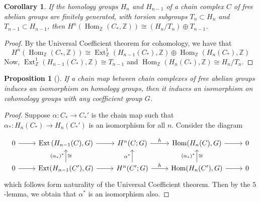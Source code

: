 \documentclass[reqno]{amsart}
\newtheorem{proposition}[theorem]{Proposition}
\newtheorem{corollary}[theorem]{Corollary}
\theoremstyle{definition}
\theoremstyle{remark}
\DeclareMathOperator{\Hom}{Hom}
\DeclareMathOperator{\Ext}{Ext}
\begin{document}
    \begin{corollary}\label{Cor:JSIOA}
        If the homology groups $H_n$ and
        $H_{n-1}$ of a chain complex
        $C$ of free abelian groups are finitely
        generated, with torsion subgroups
        $T_n \subset H_n$ and 
        $T_{n-1} \subset H_{n-1}$, then
        $H^{n}( \Hom_\mathbb{Z} (C_*, \mathbb{Z}) ) \cong
        \left( H_n / T_n \right) \oplus T_{n-1}$.
    \end{corollary}

    \begin{proof}
        By the Universal Coefficient theorem for cohomology, we
        have that
        \[
        H^{n} \left( 
        \Hom_\mathbb{Z} \left( C_*, \mathbb{Z} \right) \right) 
        \cong
        \Ext_{\mathbb{Z}}^{1} 
        \left( H_{n-1}(C_*), \mathbb{Z} \right) 
        \oplus \Hom_{\mathbb{Z}} \left( 
        H_n \left( C_*\right), \mathbb{Z} \right) 
        \] 
        Now,
        $\Ext_{\mathbb{Z}}^{1} \left( H_{n-1}(C_*),\mathbb{Z}
        \right) \cong T_{n-1}$ and
        $\Hom_{\mathbb{Z}} \left( H_n
        \left( C_* \right), \mathbb{Z} \right) 
        \cong H_n / T_n$.
    \end{proof}

    \begin{proposition}[]
        If a chain map between chain complexes of free
        abelian groups induces an isomorphism on homology
        groups, then it induces an isomorphism
        on cohomology groups with any coefficient
        group $G$.
    \end{proposition}

    \begin{proof}
        Suppose
        $\alpha \colon C_* \to C_*'$ is the chain map
        such that $\alpha_* \colon
        H_n (C_*) \to H_n (C_*')$ is an isomorphism
        for all $n$.
        Consider the diagram

        \begin{equation*}
        \begin{tikzcd}
            0 \ar[r] & 
            \Ext \left( H_{n-1}(C),G \right) 
            \ar[r] & H^{n}(C;G) \ar[r, "h"] &
            \Hom(H_n(C),G) \ar[r] & 0\\
            0 \ar[r] & 
            \Ext(H_{n-1}(C'),G) \ar[r] \ar[u, "(\alpha_*)^{*}",
            "\cong"']
                     & H^{n}(C';G) \ar[r, "h"] \ar[u, "\alpha^*"] 
                     & \Hom(H_n (C'),G) \ar[r] 
            \ar[u, "(\alpha_*)^{*}", "\cong"'] & 0
        \end{tikzcd}
        \end{equation*}
        which follows form naturality of the
        Universal Coefficient theorem.
        Then by the $5$-lemma, we obtain that
        $\alpha^*$ is an isomorphism also.
        
    \end{proof}
\end{document}
